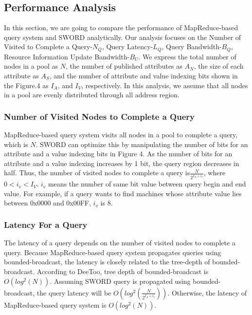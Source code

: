 \documentclass{acm_proc_article-sp}
\begin{document}
\subsection{Performance Analysis}
In this section, we are going to compare the performance of MapReduce-based query system and SWORD analytically. 
Our analysis focuses on the Number of Visited to Complete a Query-$N_Q$, Query Latency-$L_Q$, Query Bandwidth-$B_Q$, Resource Information Update Bandwidth-$B_U$.
We express the total number of nodes in a pool as $N$, the number of published attributes as $A_N$, the size of each attribute as $A_S$, 
and the number of attribute and value indexing bits shown in the Figure.4 as $I_A$, and $I_V$, respectively. In this analysis, we assume that all nodes in a pool are evenly distributed through all address region.

\subsubsection{Number of Visited Nodes to Complete a Query}
MapReduce-based query system visits all nodes in a pool to complete a query, which is $N$.
SWORD can optimize this by manipulating the number of bits for an attribute and a value indexing bits in Figure 4. As the number of bits for an attribute and a value indexing increases by 1 bit, 
the query region decreases in half. Thus, the number of visited nodes to complete a query is\begin{math}\frac{N}{2^{I_A+i_v}}\end{math}, where \begin{math}0<i_v<I_V\end{math}.
\begin{math}i_v\end{math} means the number of same bit value between query begin and end value. For example, if a query wants to find machines whose attribute value lies between 0x0000 and 0x00FF, \begin{math}i_v\end{math} is 8. 
\subsubsection{Latency For a Query}
The latency of a query depends on the number of visited nodes to complete a query. Because MapReduce-based query system propagates queries using bounded-broadcast, the latency is closely related to
the tree-depth of bounded-broadcast. According to DeeToo\cite{deetoo}, tree depth of bounded-broadcast is \begin{math}O(log^2(N))\end{math}. Assuming SWORD query is propagated using bounded-broadcast,
the query latency will be  \begin{math}O(log^2(\frac{N}{2^{I_A+i_v}}))\end{math}. Otherwise, the latency of MapReduce-based query system is  \begin{math}O(log^2(N))\end{math}.
\end{document}
